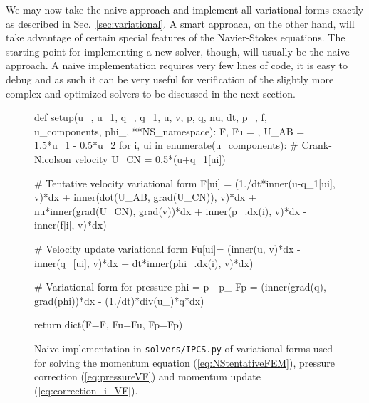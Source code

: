 \documentclass[final,3p,times,twocolumn]{elsarticle}
\newcommand{\inpyth}{\lstinline[style=inlinestyle]} %[]%
\begin{document}
We may now take the naive approach and implement all variational forms exactly as described in Sec.~\ref{sec:variational}. A smart approach, on the other hand, will take advantage of certain special features of the Navier-Stokes equations. The starting point for implementing a new solver, though, will usually be the naive approach. A naive implementation requires very few lines of code, it is easy to debug and as such it can be very useful for verification of the slightly more complex and optimized solvers to be discussed in the next section.
\begin{figure}[ht!]
\begin{python}
def setup(u_, u_1, q_, q_1, u, v, p, q, 
          nu, dt, p_, f, u_components, 
          phi_, **NS_namespace):
  F, Fu = {}, {}
  U_AB = 1.5*u_1 - 0.5*u_2
  for i, ui in enumerate(u_components):
    # Crank-Nicolson velocity  
    U_CN = 0.5*(u+q_1[ui])
    
    # Tentative velocity variational form
    F[ui] = (1./dt*inner(u-q_1[ui], v)*dx
      + inner(dot(U_AB, grad(U_CN)), v)*dx
      + nu*inner(grad(U_CN), grad(v))*dx
      + inner(p_.dx(i), v)*dx 
      - inner(f[i], v)*dx)
            
    # Velocity update variational form
    Fu[ui]= (inner(u, v)*dx 
            - inner(q_[ui], v)*dx 
            + dt*inner(phi_.dx(i), v)*dx)

  # Variational form for pressure
  phi = p - p_
  Fp = (inner(grad(q), grad(phi))*dx 
     - (1./dt)*div(u_)*q*dx) 
  
  return dict(F=F, Fu=Fu, Fp=Fp)
\end{python}
\caption{Naive implementation in \inpyth{solvers/IPCS.py} of variational forms used for solving the momentum equation (\ref{eq:NStentativeFEM}), pressure correction (\ref{eq:pressureVF}) and momentum update (\ref{eq:correction_i_VF}).}
\label{lst:momentumNaive}
\end{figure}
\end{document}
